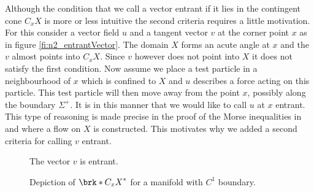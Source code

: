 Although the condition that we call a vector entrant if it lies in the contingent cone $C_xX$ is more or less intuitive
the second criteria requires a little motivation.
For this consider a vector field $u$ and a tangent vector $v$ at the corner point $x$ as in figure \ref{fi:n2_entrantVector}.
The domain $X$ forms an acute angle at $x$ and the $v$ almost points into $C_xX$.
Since $v$ however does not point into $X$ it does not satisfy the first condition.
Now assume we place a test particle in a neighbourhood of $x$ which is confined to $X$ and $u$ describes a force acting on this particle.
This test particle
will then move away from the point $x$, possibly along the boundary $\Sigma^+$.
It is in this manner that we would like to call $u$ at $x$ entrant.
This type of reasoning is made precise in the proof of the Morse inequalities in \cite{Agrach1991} and \cite{Handron2002}
where a flow on $X$ is constructed.
This motivates why we added a second criteria for calling $v$ entrant.
\begin{figure}
  \centering
  \begin{minipage}[h]{0.45\textwidth}
    \centering
    
    \caption{The vector $v$ is entrant.}
    \label{fi:n2_entrantVector}
  \end{minipage}
  \hfill
  \begin{minipage}[h]{0.45\textwidth}
    \centering
    
    \caption{Depiction of $\brk*{C_xX}^*$ for a manifold with $C^1$ boundary.}
    \label{fi:n2_contingentCone_smooth}
  \end{minipage}
\end{figure}


